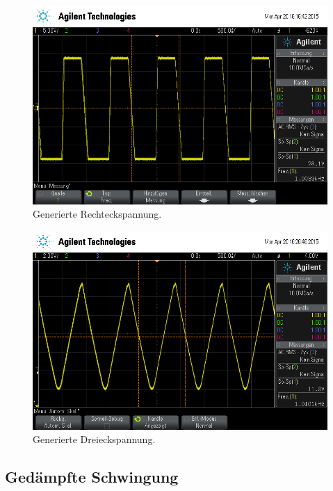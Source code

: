 \begin{figure}[!h]
    \centering
    \includegraphics[width=0.8\linewidth]{data/scope_13.png}
    \caption{Generierte Rechteckspannung.}
    \label{fig:rechteck}
\end{figure}

\begin{figure}[!h]
    \centering
    \includegraphics[width=0.8\linewidth]{data/scope_14.png}
    \caption{Generierte Dreieckspannung.}
    \label{fig:dreieck}
\end{figure}

\subsection{Gedämpfte Schwingung} %
\label{sub:subsection_name}

